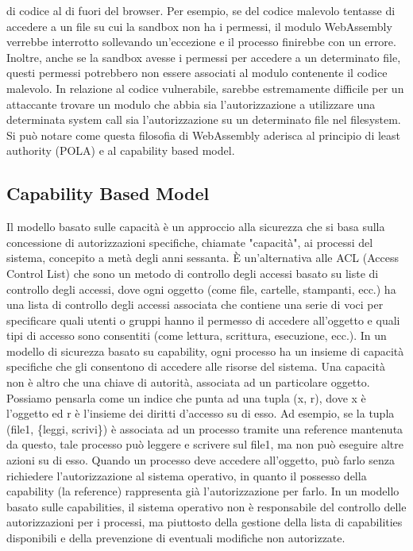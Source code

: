 di codice al di fuori del browser. Per esempio, se del codice malevolo tentasse di accedere a un file su cui la sandbox
non ha i permessi, il modulo WebAssembly verrebbe interrotto sollevando un'eccezione e il processo finirebbe con un
errore. Inoltre, anche se la sandbox avesse i permessi per accedere a un determinato file, questi permessi potrebbero
non essere associati al modulo contenente il codice malevolo. In relazione al codice vulnerabile, sarebbe estremamente
difficile per un attaccante trovare un modulo che abbia sia l'autorizzazione a utilizzare una determinata system call
sia l'autorizzazione su un determinato file nel filesystem. \\ Si può notare come questa filosofia di WebAssembly
aderisca al principio di least authority (POLA) e al capability based model.
\subsection{Capability Based Model}
Il modello basato sulle capacità è un approccio alla sicurezza che si basa sulla concessione di autorizzazioni
specifiche, chiamate "capacità", ai processi del sistema, concepito a metà degli anni
sessanta\cite{capability-based-security}. È un'alternativa alle ACL (Access Control List) che sono un metodo di
controllo degli accessi basato su liste di controllo degli accessi, dove ogni oggetto (come file, cartelle, stampanti,
ecc.) ha una lista di controllo degli accessi associata che contiene una serie di voci per specificare quali utenti o
gruppi hanno il permesso di accedere all'oggetto e quali tipi di accesso sono consentiti (come lettura, scrittura,
esecuzione, ecc.). In un modello di sicurezza basato su capability, ogni processo ha un insieme di capacità specifiche
che gli consentono di accedere alle risorse del sistema. Una capacità non è altro che una chiave di autorità, associata
ad un particolare oggetto. Possiamo pensarla come un indice che punta ad una tupla\cite{wasm-capability-tuple} (x, r),
dove x è l'oggetto ed r è l'insieme dei diritti d'accesso su di esso. Ad esempio, se la tupla (file1, \{leggi, scrivi\})
è associata ad un processo tramite una reference mantenuta da questo, tale processo può leggere e scrivere sul file1, ma
non può eseguire altre azioni su di esso. Quando un processo deve accedere all'oggetto, può farlo senza richiedere
l'autorizzazione al sistema operativo, in quanto il possesso della capability (la reference) rappresenta già
l'autorizzazione per farlo. In un modello basato sulle capabilities, il sistema operativo non è responsabile del
controllo delle autorizzazioni per i processi, ma piuttosto della gestione della lista di capabilities disponibili e
della prevenzione di eventuali modifiche non autorizzate.
